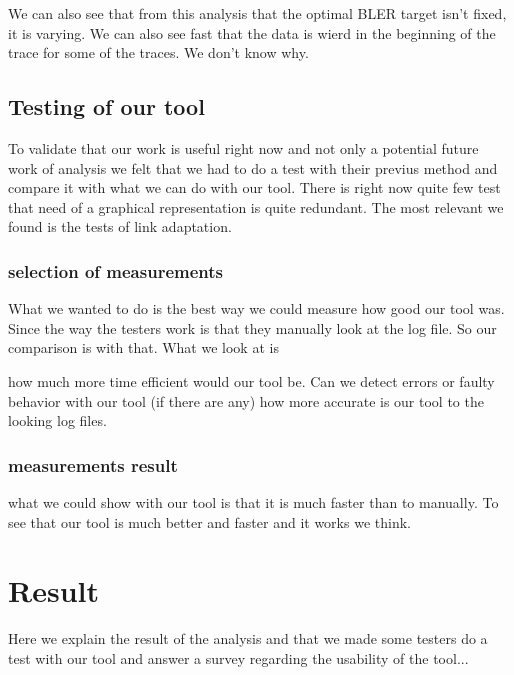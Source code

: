\documentclass[cropmarks, frame, english]{idamasterthesis}
\begin{document}
We can also see that from this analysis that the optimal BLER target isn't fixed, it is varying.
We can also see fast that the data is wierd in the beginning of the trace for some of the traces. We don't know why. 

\section{Testing of our tool}
To validate that our work is useful right now and not only a potential future work of analysis we felt that we had to do a test with their previus method and compare it with what we can do with our tool. There is right now quite few test that need of a graphical representation is quite redundant. The most relevant we found is the tests of link adaptation.

\subsection{selection of measurements}
What we wanted to do is the best way we could measure how good our tool was. Since the way the testers work is that they manually look at the log file. So our comparison is with that. What we look at is

how much more time efficient would our tool be.
Can we detect errors or faulty behavior with our tool (if there are any)
how more accurate is our tool to the looking log files.

\subsection{measurements result}
what we could show with our tool is that it is much faster than to manually. To see that our tool is much better and faster and it works we think.

















\chapter{Result}
Here we explain the result of the analysis and that we made some testers do a test with our tool and answer a survey regarding the usability of the tool...
\end{document}
